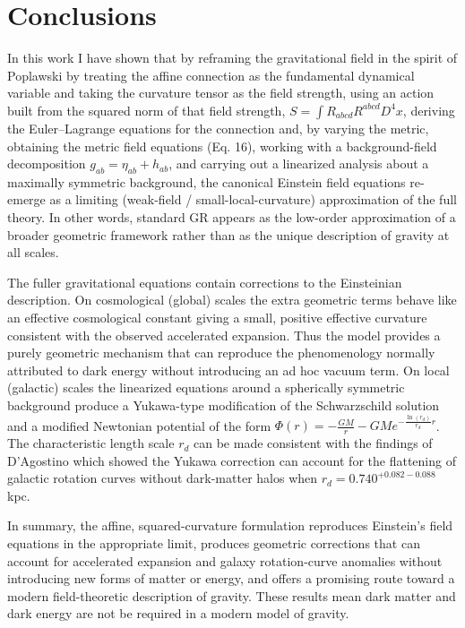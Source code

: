 \documentclass[aps,prd,preprint]{revtex4-1}
\begin{document}
\section*{Conclusions}
In this work I have shown that by reframing the gravitational field in the spirit of Poplawski by treating the affine connection as the fundamental dynamical variable and taking the curvature tensor as the field strength, using an action built from the squared norm of that field strength, $S=\int{R_{abcd}R^{abcd}D^4x}$, deriving the Euler–Lagrange equations for the connection and, by varying the metric, obtaining the metric field equations (Eq. 16), working with a background-field decomposition $g_{ab}=\eta_{ab}+h_{ab}$, and carrying out a linearized analysis about a maximally symmetric background, the canonical Einstein field equations re-emerge as a limiting (weak-field / small-local-curvature) approximation of the full theory. In other words, standard GR appears as the low-order approximation of a broader geometric framework rather than as the unique description of gravity at all scales.

The fuller gravitational equations contain corrections to the Einsteinian description. On cosmological (global) scales the extra geometric terms behave like an effective cosmological constant giving a small, positive effective curvature consistent with the observed accelerated expansion. Thus the model provides a purely geometric mechanism that can reproduce the phenomenology normally attributed to dark energy without introducing an ad hoc vacuum term. On local (galactic) scales the linearized equations around a spherically symmetric background produce a Yukawa-type modification of the Schwarzschild solution and a modified Newtonian potential of the form $\Phi(r) = -\frac{GM}{r} - G M e^{-\frac{\ln(r_d)}{r_d} r}$. The characteristic length scale $r_d$ can be made consistent with the findings of D'Agostino which showed the Yukawa correction can account for the flattening of galactic rotation curves without dark-matter halos when $r_d=0.740^{+0.082-0.088}$kpc.

In summary, the affine, squared-curvature formulation reproduces Einstein’s field equations in the appropriate limit, produces geometric corrections that can account for accelerated expansion and galaxy rotation-curve anomalies without introducing new forms of matter or energy, and offers a promising route toward a modern field-theoretic description of gravity. These results mean dark matter and dark energy are not be required in a modern model of gravity.
\end{document}
